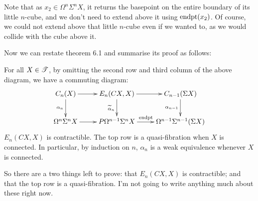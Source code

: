 \documentclass[11pt]{article}
\newcommand{\labsq}[6][0]{
\draw (#2+#1,#3)--(#4+#1,#3)--(#4+#1,#5)--(#2+#1,#5)-- cycle;
\path (.5*#2+.5*#4+#1,.5*#3+.5*#5) node[font=\scriptsize] {#6};
}
\begin{document}
\begin{chapter4-6}
\begin{center}
\end{center}
Note that as $x_2\in\Omega^{n}\Sigma^nX$, it returns the basepoint on the entire boundary of its little $n$-cube, and we don't need to extend above it using $\textup{endpt}(x_2)$. Of course, we could not extend above that little $n$-cube even if we wanted to, as we would collide with the cube above it.

Now we can restate theorem 6.1 and summarise its proof as follows:
\begin{thm*}[6.1 --- Approximation]
For all $X\in\mathscr{T}$, by omitting the second row and third column of the above diagram, we have a commuting diagram:
\[\xymatrix{
C_n(X)\ar[r]\ar[d]_{\alpha_n}&
E_n(CX,X)\ar[d]_{\widetilde{\alpha}_n}\ar[r]&
C_{n-1}(\Sigma X)\ar[d]_{\alpha_{n-1}}\\
\Omega^n\Sigma^nX\ar[r]&
P\Omega^{n-1}\Sigma^nX\ar[r]^{\textup{endpt\quad }}&
\Omega^{n-1}\Sigma^{n-1}(\Sigma X)
}\]
$E_n(CX,X)$ is contractible. The top row is a quasi-fibration when $X$ is connected. In particular, by induction on $n$, $\alpha_n$ is a weak equivalence whenever $X$ is connected.
\end{thm*}
\noindent So there are a two things left to prove: that $E_n(CX,X)$ is contractible; and that the top row is a quasi-fibration. I'm not going to write anything much about these right now.

\end{chapter4-6}
\end{document}
